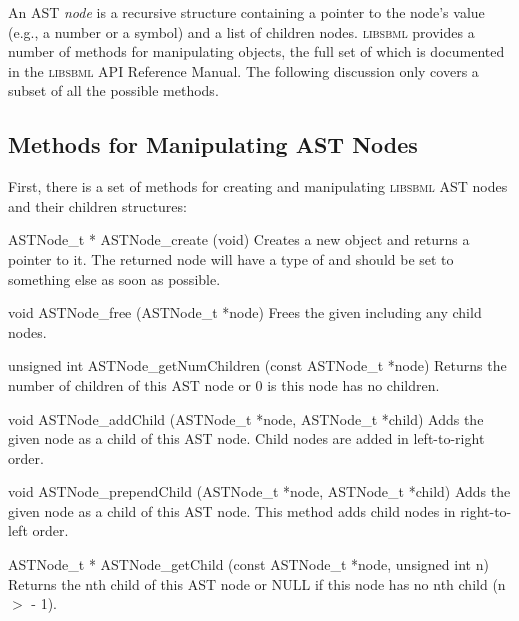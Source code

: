 \documentclass{sbmlmanual}
\newcommand{\libsbml}{\textsc{libsbml}}
\begin{document}
An AST \emph{node} is a recursive structure containing a pointer to the
node's value (e.g., a number or a symbol) and a list of children nodes.
\libsbml{} provides a number of methods for manipulating 
objects, the full set of which is documented in the \libsbml{} API
Reference Manual.   The following discussion only covers a subset of all
the possible methods.


\subsection{Methods for Manipulating AST Nodes}

First, there is a set of methods for creating and manipulating \libsbml{}
AST nodes and their children structures:

\begin{methoddef}{ASTNode\_t * ASTNode\_create (void)}
  Creates a new  object and returns a pointer to it.  The
  returned node will have a type of  and should be set
  to something else as soon as possible.
\end{methoddef}


\begin{methoddef}{void ASTNode\_free (ASTNode\_t *node)}
  Frees the given  including any child nodes.
\end{methoddef}


\begin{methoddef}{unsigned int ASTNode\_getNumChildren (const ASTNode\_t *node)}
  Returns the number of children of this AST node or 0 is this node has no
  children.
\end{methoddef}


\begin{methoddef}{void ASTNode\_addChild (ASTNode\_t *node, ASTNode\_t *child)}
  Adds the given node as a child of this AST node.  Child nodes are added
  in left-to-right order.
\end{methoddef}


\begin{methoddef}{void ASTNode\_prependChild (ASTNode\_t *node, ASTNode\_t *child)}
  Adds the given node as a child of this AST node.  This method adds child
  nodes in right-to-left order.
\end{methoddef}


\begin{methoddef}{ASTNode\_t * ASTNode\_getChild (const ASTNode\_t *node, unsigned int n)}
  Returns the nth child of this AST node or NULL if this node has no nth
  child (n $>$  - 1).
\end{methoddef}
\end{document}

